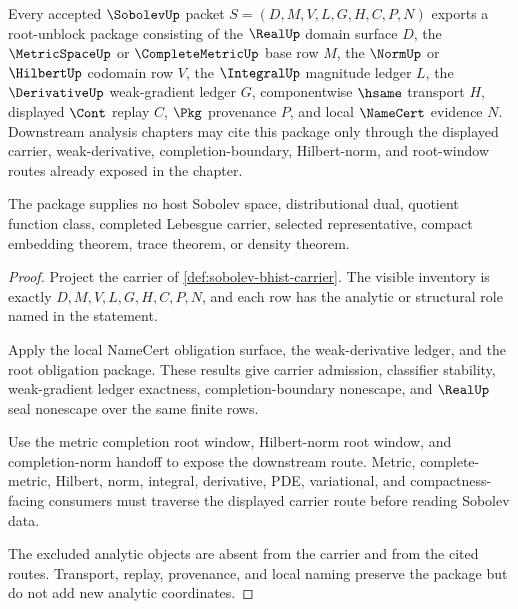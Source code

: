 \begin{theorem}
\label{thm:sobolev-root-unblock-package}
Every accepted $\SobolevUp$ packet $S=(D,M,V,L,G,H,C,P,N)$ exports a root-unblock package consisting of the $\RealUp$ domain surface $D$, the $\MetricSpaceUp$ or $\CompleteMetricUp$ base row $M$, the $\NormUp$ or $\HilbertUp$ codomain row $V$, the $\IntegralUp$ magnitude ledger $L$, the $\DerivativeUp$ weak-gradient ledger $G$, componentwise $\hsame$ transport $H$, displayed $\Cont$ replay $C$, $\Pkg$ provenance $P$, and local $\NameCert$ evidence $N$. Downstream analysis chapters may cite this package only through the displayed carrier, weak-derivative, completion-boundary, Hilbert-norm, and root-window routes already exposed in the chapter.

The package supplies no host Sobolev space, distributional dual, quotient function class, completed Lebesgue carrier, selected representative, compact embedding theorem, trace theorem, or density theorem.
\end{theorem}
\begin{proof}
Project the carrier of \autoref{def:sobolev-bhist-carrier}. The visible inventory is exactly $D,M,V,L,G,H,C,P,N$, and each row has the analytic or structural role named in the statement.

Apply the local NameCert obligation surface, the weak-derivative ledger, and the root obligation package. These results give carrier admission, classifier stability, weak-gradient ledger exactness, completion-boundary nonescape, and $\RealUp$ seal nonescape over the same finite rows.

Use the metric completion root window, Hilbert-norm root window, and completion-norm handoff to expose the downstream route. Metric, complete-metric, Hilbert, norm, integral, derivative, PDE, variational, and compactness-facing consumers must traverse the displayed carrier route before reading Sobolev data.

The excluded analytic objects are absent from the carrier and from the cited routes. Transport, replay, provenance, and local naming preserve the package but do not add new analytic coordinates.
\end{proof}


